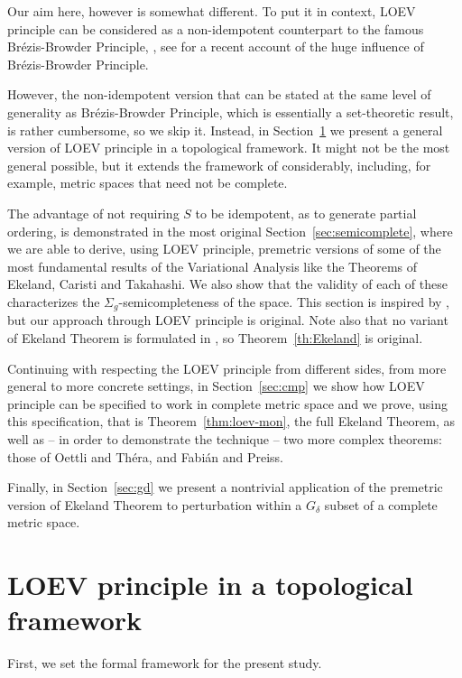 \documentclass[12pt]{article}
\begin{document}
Our aim here, however is somewhat different. To put it in context, LOEV principle can be considered as a non-idempotent counterpart to the famous Br\'ezis-Browder Principle, \cite{br}, see \cite{pbr} for a recent account of the huge influence of Br\'ezis-Browder Principle.

However, the non-idempotent version that can be stated at the same level of generality as Br\'ezis-Browder Principle, which is essentially a set-theoretic result, is rather cumbersome, so we skip it. Instead, in Section~\ref{sec:topology} we  present a general version of LOEV principle in a topological framework. It might not be the most general possible, but it extends the framework of \cite{Ivanov-Zlateva} considerably, including, for example, metric spaces that need not be complete.

The advantage of not requiring $S$ to be idempotent, as to generate partial ordering, is demonstrated in the most original Section~\ref{sec:semicomplete}, where we are able to derive, using LOEV principle, premetric versions of some of the most fundamental results of the Variational Analysis like the Theorems of Ekeland, Caristi and Takahashi. We also show that the validity of each of these characterizes the $\Sigma_g$-semicompleteness of the space. This section is inspired by \cite{Suzuki-2018}, but our approach through LOEV principle is original. Note also that no variant of Ekeland Theorem is formulated in \cite{Suzuki-2018}, so Theorem~\ref{th:Ekeland} is original.

Continuing with respecting the LOEV principle from different sides, from more general to more concrete settings, in Section~\ref{sec:cmp} we show how LOEV principle can be specified to work in complete metric space and we prove,  using this specification,  that is Theorem~\ref{thm:loev-mon}, the full Ekeland Theorem, as well as -- in order to demonstrate the technique -- two more complex theorems: those of Oettli and Th\'era, and Fabi\'an and Preiss.

Finally, in Section~\ref{sec:gd} we present a nontrivial application of the premetric version of Ekeland Theorem to perturbation within a $G_\delta$ subset of a complete metric space.

\section{LOEV principle in a topological framework}\label{sec:topology}


First, we set the formal framework for the present study.
\end{document}
